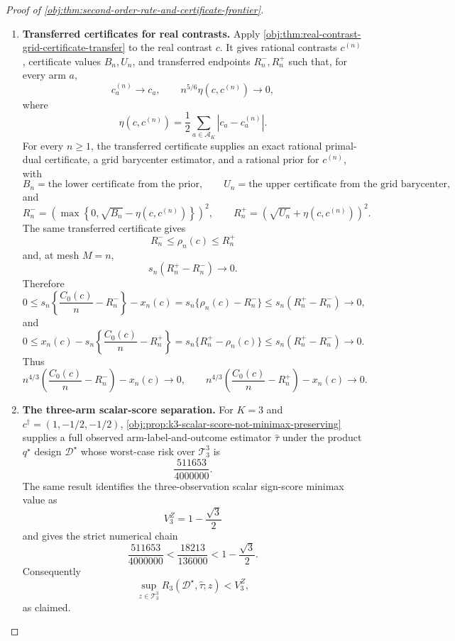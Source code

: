 \documentclass[11pt]{article}
\begin{document}
\begin{proof}[Proof of \cref{obj:thm:second-order-rate-and-certificate-frontier}]
\begin{enumerate}
\item \textbf{Transferred certificates for real contrasts.}
Apply \cref{obj:thm:real-contrast-grid-certificate-transfer} to the real contrast \(c\). It gives rational contrasts \(c^{(n)}\), certificate values \(B_n,U_n\), and transferred endpoints \(R_n^-,R_n^+\) such that, for every arm \(a\),
\[
c_a^{(n)}\to c_a,
\qquad
n^{5/6}\eta(c,c^{(n)})\to0,
\]
where
\[
\eta(c,c^{(n)})
=
\frac12\sum_{a\in\mathcal A_K}|c_a-c_a^{(n)}|.
\]
For every \(n\ge1\), the transferred certificate supplies an exact rational primal-dual certificate, a grid barycenter estimator, and a rational prior for \(c^{(n)}\), with
\[
B_n=\text{the lower certificate from the prior},
\qquad
U_n=\text{the upper certificate from the grid barycenter},
\]
and
\[
R_n^-=
\left(\max\left\{0,\sqrt{B_n}-\eta(c,c^{(n)})\right\}\right)^2,
\qquad
R_n^+=
\left(\sqrt{U_n}+\eta(c,c^{(n)})\right)^2.
\]
The same transferred certificate gives
\[
R_n^-\le \rho_n(c)\le R_n^+
\]
and, at mesh \(M=n\),
\[
s_n(R_n^+-R_n^-)\to0.
\]
Therefore
\[
0
\le
s_n\left\{\frac{C_0(c)}{n}-R_n^-\right\}-x_n(c)
=
s_n\{\rho_n(c)-R_n^-\}
\le
s_n(R_n^+-R_n^-)\to0,
\]
and
\[
0
\le
x_n(c)-s_n\left\{\frac{C_0(c)}{n}-R_n^+\right\}
=
s_n\{R_n^+-\rho_n(c)\}
\le
s_n(R_n^+-R_n^-)\to0.
\]
Thus
\[
n^{4/3}\left(\frac{C_0(c)}{n}-R_n^-\right)-x_n(c)\to0,
\qquad
n^{4/3}\left(\frac{C_0(c)}{n}-R_n^+\right)-x_n(c)\to0.
\] %

\item \textbf{The three-arm scalar-score separation.}
For \(K=3\) and \(c^\dagger=(1,-1/2,-1/2)\), \cref{obj:prop:k3-scalar-score-not-minimax-preserving} supplies a full observed arm-label-and-outcome estimator \(\widehat\tau\) under the product \(q^\star\) design \(\mathcal D^\star\) whose worst-case risk over \(\mathcal T_3^3\) is
\[
\frac{511653}{4000000}.
\]
The same result identifies the three-observation scalar sign-score minimax value as
\[
V_3^Z=1-\frac{\sqrt3}{2}
\]
and gives the strict numerical chain
\[
\frac{511653}{4000000}
<
\frac{18213}{136000}
<
1-\frac{\sqrt3}{2}.
\]
Consequently
\[
\sup_{z\in\mathcal T_3^3}
R_3(\mathcal D^\star,\widehat\tau;z)
<
V_3^Z,
\]
as claimed. %
\end{enumerate}
\end{proof}
\end{document}
